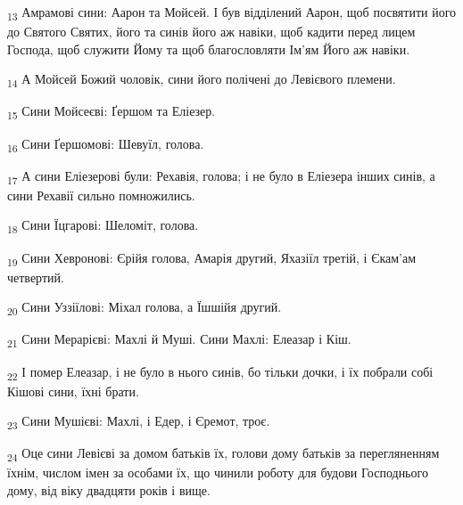 \begin{tcolorbox}
\textsubscript{13} Амрамові сини: Аарон та Мойсей. І був відділений Аарон, щоб посвятити його до Святого Святих, його та синів його аж навіки, щоб кадити перед лицем Господа, щоб служити Йому та щоб благословляти Ім'ям Його аж навіки.
\end{tcolorbox}
\begin{tcolorbox}
\textsubscript{14} А Мойсей Божий чоловік, сини його полічені до Левієвого племени.
\end{tcolorbox}
\begin{tcolorbox}
\textsubscript{15} Сини Мойсеєві: Ґершом та Еліезер.
\end{tcolorbox}
\begin{tcolorbox}
\textsubscript{16} Сини Ґершомові: Шевуїл, голова.
\end{tcolorbox}
\begin{tcolorbox}
\textsubscript{17} А сини Еліезерові були: Рехавія, голова; і не було в Еліезера інших синів, а сини Рехавії сильно помножились.
\end{tcolorbox}
\begin{tcolorbox}
\textsubscript{18} Сини Їцгарові: Шеломіт, голова.
\end{tcolorbox}
\begin{tcolorbox}
\textsubscript{19} Сини Хевронові: Єрійя голова, Амарія другий, Яхазіїл третій, і Єкам'ам четвертий.
\end{tcolorbox}
\begin{tcolorbox}
\textsubscript{20} Сини Уззіїлові: Міхал голова, а Їшшійя другий.
\end{tcolorbox}
\begin{tcolorbox}
\textsubscript{21} Сини Мерарієві: Махлі й Муші. Сини Махлі: Елеазар і Кіш.
\end{tcolorbox}
\begin{tcolorbox}
\textsubscript{22} І помер Елеазар, і не було в нього синів, бо тільки дочки, і їх побрали собі Кішові сини, їхні брати.
\end{tcolorbox}
\begin{tcolorbox}
\textsubscript{23} Сини Мушієві: Махлі, і Едер, і Єремот, троє.
\end{tcolorbox}
\begin{tcolorbox}
\textsubscript{24} Оце сини Левієві за домом батьків їх, голови дому батьків за перегляненням їхнім, числом імен за особами їх, що чинили роботу для будови Господнього дому, від віку двадцяти років і вище.
\end{tcolorbox}
